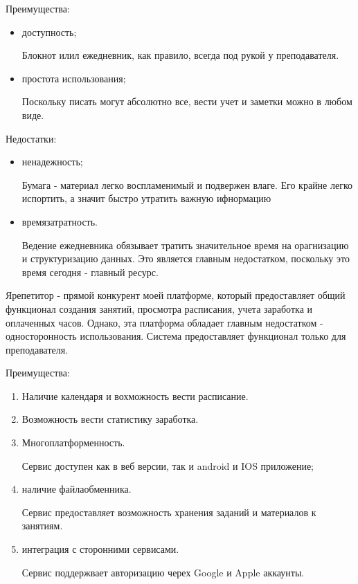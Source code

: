 \documentclass{disser}
\begin{document}
Преимущества:
\begin{itemize}
    \item доступность;
    
Блокнот илил ежедневник, как правило, всегда под рукой у преподавателя.
    \item простота использования;
    
Поскольку писать могут абсолютно все, вести учет и заметки можно в любом виде.
\end{itemize}
Недостатки:
\begin{itemize}
    \item ненадежность;
    
Бумага - материал легко воспламенимый и подвержен влаге. Его крайне легко испортить, а значит быстро утратить важную ифнормацию
    \item времязатратность.
    
Ведение ежедневника обязывает тратить значительное время на орагнизацию и структуризацию данных. Это является главным недостатком, поскольку это время сегодня - главный ресурс.

\end{itemize}

Ярепетитор - прямой конкурент моей платформе, который предоставляет общий функционал создания занятий, просмотра расписания, учета заработка и оплаченных часов.
Однако, эта платформа обладает главным недостатком - односторонность использования. 
Система предоставляет функционал только для преподавателя.

Преимущества:
\begin{enumerate}
    \item Наличие календаря и вохможность вести расписание.
    \item Возможность вести статистику заработка.
    \item Многоплатформенность.
    
Сервис доступен как в веб версии, так и android и IOS приложение;
    \item наличие файлаобменника.
    
Сервис предоставляет возможность хранения заданий и материалов к занятиям.
    \item интеграция с сторонними сервисами. 
    
Сервис поддержвает авторизацию черех Google и Apple аккаунты.
\end{enumerate}
\end{document}
